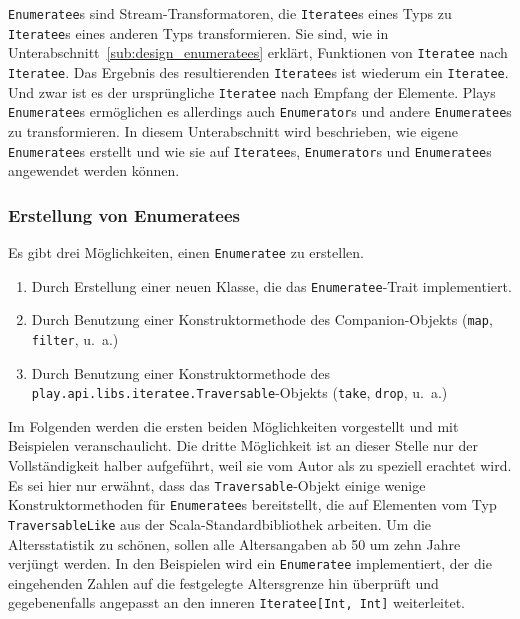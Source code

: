 \lstinline|Enumeratee|s sind Stream-Transformatoren, die \lstinline|Iteratee|s eines Typs zu \lstinline|Iteratee|s eines anderen Typs transformieren.
Sie sind, wie in Unterabschnitt~\ref{sub:design_enumeratees} erklärt, Funktionen von \lstinline|Iteratee| nach \lstinline|Iteratee|.
Das Ergebnis des resultierenden \lstinline|Iteratee|s ist wiederum ein \lstinline|Iteratee|.
Und zwar ist es der ursprüngliche \lstinline|Iteratee| nach Empfang der Elemente.
Plays \lstinline|Enumeratee|s ermöglichen es allerdings auch \lstinline|Enumerator|s und andere \lstinline|Enumeratee|s zu transformieren.
In diesem Unterabschnitt wird beschrieben, wie eigene \lstinline|Enumeratee|s erstellt und wie sie auf \lstinline|Iteratee|s, \lstinline|Enumerator|s und \lstinline|Enumeratee|s angewendet werden können.

\subsubsection{Erstellung von Enumeratees} %
\label{ssub:erstellung_von_enumeratees}

Es gibt drei Möglichkeiten, einen \lstinline|Enumeratee| zu erstellen.

\begin{enumerate}
  \item Durch Erstellung einer neuen Klasse, die das \lstinline|Enumeratee|-Trait implementiert.
  \item Durch Benutzung einer Konstruktormethode des Companion-Objekts (\lstinline|map|, \lstinline|filter|, u.~a.)
  \item Durch Benutzung einer Konstruktormethode des \lstinline|play.api.libs.iteratee.Traversable|-Objekts (\lstinline|take|, \lstinline|drop|, u.~a.)
\end{enumerate}

Im Folgenden werden die ersten beiden Möglichkeiten vorgestellt und mit Beispielen veranschaulicht.
Die dritte Möglichkeit ist an dieser Stelle nur der Vollständigkeit halber aufgeführt, weil sie vom Autor als zu speziell erachtet wird.
Es sei hier nur erwähnt, dass das \lstinline|Traversable|-Objekt einige wenige Konstruktormethoden für \lstinline|Enumeratee|s bereitstellt, die auf Elementen vom Typ \lstinline|TraversableLike| aus der Scala-Standardbibliothek arbeiten.
Um die Altersstatistik zu schönen, sollen alle Altersangaben ab 50 um zehn Jahre verjüngt werden.
In den Beispielen wird ein \lstinline|Enumeratee| implementiert, der die eingehenden Zahlen auf die festgelegte Altersgrenze hin überprüft und gegebenenfalls angepasst an den inneren \lstinline|Iteratee[Int, Int]| weiterleitet.

